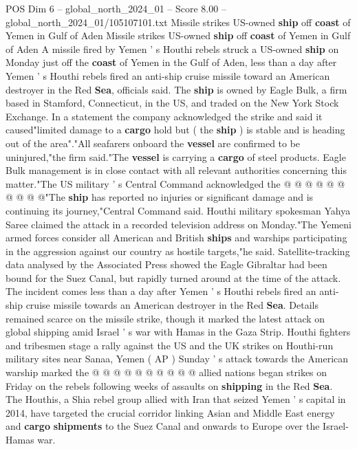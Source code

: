 \begin{textsample}{POS Dim 6 – global\_north\_2024\_01 – Score 8.00 – global\_north\_2024\_01/105107101.txt}  \label{ex:f6_pos_098}
Missile strikes US-owned \textbf{ship} off \textbf{coast} of Yemen in Gulf of Aden Missile strikes US-owned \textbf{ship} off \textbf{coast} of Yemen in Gulf of Aden A missile fired by Yemen ' s Houthi rebels struck a US-owned \textbf{ship} on Monday just off the \textbf{coast} of Yemen in the Gulf of Aden, less than a day after Yemen ' s Houthi rebels fired an anti-ship cruise missile toward an American destroyer in the Red \textbf{Sea}, officials said.
The \textbf{ship} is owned by Eagle Bulk, a firm based in Stamford, Connecticut, in the US, and traded on the New York Stock Exchange.
In a statement the company acknowledged the strike and said it caused"limited damage to a \textbf{cargo} hold but ( the \textbf{ship} ) is stable and is heading out of the area"."All seafarers onboard the \textbf{vessel} are confirmed to be uninjured,"the firm said."The \textbf{vessel} is carrying a \textbf{cargo} of steel products.
Eagle Bulk management is in close contact with all relevant authorities concerning this matter."The US military ' s Central Command acknowledged the @ @ @ @ @ @ @ @ @ @"The \textbf{ship} has reported no injuries or significant damage and is continuing its journey,"Central Command said.
Houthi military spokesman Yahya Saree claimed the attack in a recorded television address on Monday."The Yemeni armed forces consider all American and British \textbf{ships} and warships participating in the aggression against our country as hostile targets,"he said.
Satellite-tracking data analysed by the Associated Press showed the Eagle Gibraltar had been bound for the Suez Canal, but rapidly turned around at the time of the attack.
The incident comes less than a day after Yemen ' s Houthi rebels fired an anti-ship cruise missile towards an American destroyer in the Red \textbf{Sea}.
Details remained scarce on the missile strike, though it marked the latest attack on global shipping amid Israel ' s war with Hamas in the Gaza Strip.
Houthi fighters and tribesmen stage a rally against the US and the UK strikes on Houthi-run military sites near Sanaa, Yemen ( AP ) Sunday ' s attack towards the American warship marked the @ @ @ @ @ @ @ @ @ @ allied nations began strikes on Friday on the rebels following weeks of assaults on \textbf{shipping} in the Red \textbf{Sea}.
The Houthis, a Shia rebel group allied with Iran that seized Yemen ' s capital in 2014, have targeted the crucial corridor linking Asian and Middle East energy and \textbf{cargo} \textbf{shipments} to the Suez Canal and onwards to Europe over the Israel-Hamas war.

\end{textsample}
